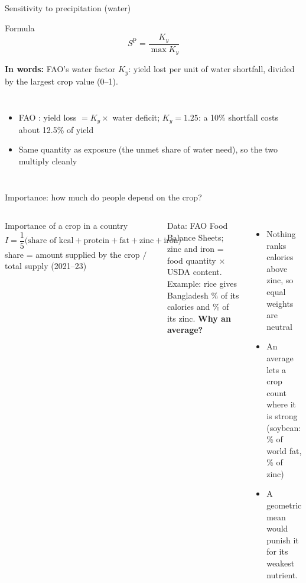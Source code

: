 \documentclass[aspectratio=169,11pt]{beamer}
\let\parencite\citep
\newcommand{\PP}{\mathrm{P}}   %
\begin{document}
\begin{frame}{Sensitivity to precipitation (water)}
\begin{block}{Formula}
\[S^{\PP}=\frac{K_y}{\max K_y}\]
\end{block}
\textbf{In words:} FAO's water factor $K_y$: yield lost per unit of water shortfall, divided by the largest crop value (0--1).

\begin{columns}[T]
\footnotesize
\begin{itemize}\setlength{\itemsep}{2pt}
\item FAO \parencite{fao66}: yield loss $=K_y\times$ water deficit; $K_y=1.25$: a 10\% shortfall costs about 12.5\% of yield
\item Same quantity as exposure (the unmet share of water need), so the two multiply cleanly
\end{itemize}
\footnotesize\centering
{}\\[0.4em]
\end{columns}
\end{frame}

\begin{frame}{Importance: how much do people depend on the crop?}
\begin{columns}[T]
\begin{block}{Importance of a crop in a country}
\[ I=\frac15\Big(\text{share of kcal}+\text{protein}+\text{fat}+\text{zinc}+\text{iron}\Big) \]
\centering\small share = amount supplied by the crop $\big/$ total supply (2021--23)
\end{block}
\footnotesize
Data: FAO Food Balance Sheets; zinc and iron = food quantity $\times$ USDA content. Example: rice gives Bangladesh \bdRiceKcal\% of its calories and \bdRiceZinc\% of its zinc.
\footnotesize
\textbf{Why an average?}
\begin{itemize}
    \item Nothing ranks calories above zinc, so equal weights are neutral
    \item An average lets a crop count where it is strong (soybean: \worldFatSoybean\% of world fat, \worldZincSoybean\% of zinc)
    \item A geometric mean would punish it for its weakest nutrient.
\end{itemize}
\end{columns}
\end{frame}
\end{document}
